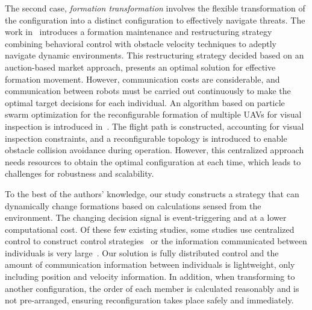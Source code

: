 The second case, \textit{formation transformation} involves the flexible transformation of the configuration into a distinct configuration to effectively navigate threats. The work in~\cite{Fu2020} introduces a formation maintenance and restructuring strategy combining behavioral control with obstacle velocity techniques to adeptly navigate dynamic environments. This restructuring strategy decided based on an auction-based market approach, presents an optimal solution for effective formation movement. However, communication costs are considerable, and communication between robots must be carried out continuously to make the optimal target decisions for each individual. An algorithm based on particle swarm optimization for the reconfigurable formation of multiple UAVs for visual inspection is introduced in~\cite{8843165}. The flight path is constructed, accounting for visual inspection constraints, and a reconfigurable topology is introduced to enable obstacle collision avoidance during operation. However, this centralized approach needs resources to obtain the optimal configuration at each time, which leads to challenges for robustness and scalability.

To the best of the authors' knowledge, our study constructs a strategy that can dynamically change formations based on calculations sensed from the environment. The changing decision signal is event-triggering and at a lower computational cost. Of these few existing studies, some studies use centralized control to construct control strategies~\cite{Gmez2013,Roy2018,AlonsoMora2017,8843165} or the information communicated between individuals is very large~\cite{Saska2020,Fu2020}. Our solution is fully distributed control and the amount of communication information between individuals is lightweight, only including position and velocity information. In addition, when transforming to another configuration, the order of each member is calculated reasonably and is not pre-arranged, ensuring reconfiguration takes place safely and immediately.

